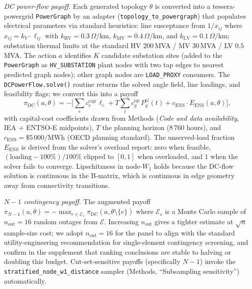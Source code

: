 \documentclass[10pt,a4paper]{article}
\begin{document}
\textit{DC power-flow payoff.} Each generated topology $\theta$
is converted into a tessera-powergrid \texttt{PowerGraph} by an
adapter (\texttt{topology\_to\_powergraph}) that populates
electrical parameters via standard heuristics: line susceptance
from $1/x_{ij}$ where $x_{ij} = k_V \cdot \ell_{ij}$ with
$k_{\mathrm{HV}} = 0.3\,\Omega/\mathrm{km}$,
$k_{\mathrm{MV}} = 0.4\,\Omega/\mathrm{km}$, and
$k_{\mathrm{LV}} = 0.1\,\Omega/\mathrm{km}$;
substation thermal limits at the standard
HV $200$\,MVA / MV $30$\,MVA / LV $0.5$\,MVA. The action $a$
identifies $K$ candidate substation sites (added to the
\texttt{PowerGraph} as \texttt{HV\_SUBSTATION} plant nodes with
two tap edges to nearest predicted graph nodes); other graph
nodes are \texttt{LOAD\_PROXY} consumers. The
\texttt{DCPowerFlow.solve()} routine returns the solved angle
field, line loadings, and feasibility flags; we convert this
into a payoff
\[
  \pi_{\mathrm{DC}}(a, \theta) =
   -\Big[\sum_e c^{\mathrm{cap}}_e\,\ell_e
     + T \!\sum_t c^{\mathrm{op}}_g\, P^G_g(t)
     + c_{\mathrm{ENS}} \cdot E_{\mathrm{ENS}}(a, \theta)\Big],
\]
with capital-cost coefficients drawn from
Methods (\textit{Code and data availability}, IEA + ENTSO-E
midpoints), $T$ the planning horizon (8\,760 hours), and
$c_{\mathrm{ENS}} = \$5\,000/\mathrm{MWh}$ (OECD planning standard).
The unserved-load fraction $E_{\mathrm{ENS}}$ is derived from the
solver's overload report: zero when feasible, $(\mathrm{loading} - 100\%)/100\%$
clipped to $[0, 1]$ when overloaded, and $1$ when the solver
fails to converge. Lipschitzness in node-$W_1$ holds because the
DC-flow solution is continuous in the B-matrix, which is
continuous in edge geometry away from connectivity transitions.

\textit{$N\!-\!1$ contingency payoff.} The augmented payoff
$\pi_{N\!-\!1}(a, \theta) = -\max_{e \in \mathcal{E}_s} \pi_{\mathrm{DC}}(a, \theta \setminus \{e\})$
where $\mathcal{E}_s$ is a Monte Carlo sample of $n_{\mathrm{out}} = 16$
random outages from $\mathcal{E}$. Increasing $n_{\mathrm{out}}$
gives a tighter estimate at $\sqrt{n}$ sample-size cost; we
adopt $n_{\mathrm{out}} = 16$ for the panel to align with the
standard utility-engineering recommendation for single-element
contingency screening, and confirm in the supplement that ranking
conclusions are stable to halving or doubling this budget.
Cut-set-sensitive payoffs (specifically $N\!-\!1$) invoke the
\texttt{stratified\_node\_w1\_distance} sampler
(Methods, ``Subsampling sensitivity'') automatically.
\end{document}
